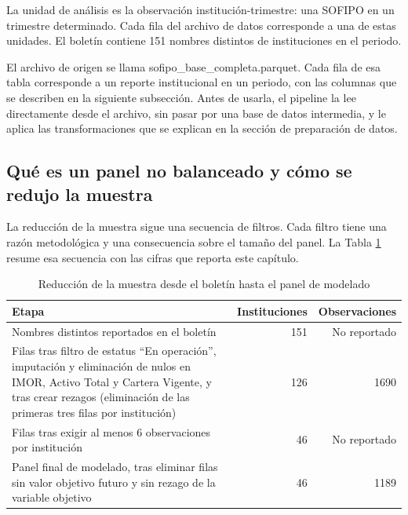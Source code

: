 La unidad de análisis es la observación institución-trimestre: una SOFIPO en un trimestre determinado. Cada fila del archivo de datos corresponde a una de estas unidades. El boletín contiene 151 nombres distintos de instituciones en el periodo. %

El archivo de origen se llama sofipo\_base\_completa.parquet. Cada fila de esa tabla corresponde a un reporte institucional en un periodo, con las columnas que se describen en la siguiente subsección. Antes de usarla, el pipeline la lee directamente desde el archivo, sin pasar por una base de datos intermedia, y le aplica las transformaciones que se explican en la sección de preparación de datos.

\subsection{Qué es un panel no balanceado y cómo se redujo la muestra}
La reducción de la muestra sigue una secuencia de filtros. Cada filtro tiene una razón metodológica y una consecuencia sobre el tamaño del panel. La Tabla \ref{tab:met_embudo} resume esa secuencia con las cifras que reporta este capítulo.

\begin{table}[H]
\centering
\caption{Reducción de la muestra desde el boletín hasta el panel de modelado}
\label{tab:met_embudo}
\small
\begin{tabularx}{\textwidth}{Xrr}
\toprule
\textbf{Etapa} & \textbf{Instituciones} & \textbf{Observaciones} \\
\midrule
Nombres distintos reportados en el boletín & 151 & No reportado \\
Filas tras filtro de estatus ``En operación'', imputación y eliminación de nulos en IMOR, Activo Total y Cartera Vigente, y tras crear rezagos (eliminación de las primeras tres filas por institución) & 126 & 1690 \\
Filas tras exigir al menos 6 observaciones por institución & 46 & No reportado \\
Panel final de modelado, tras eliminar filas sin valor objetivo futuro y sin rezago de la variable objetivo & 46 & 1189 \\
\bottomrule
\end{tabularx}
\end{table}

